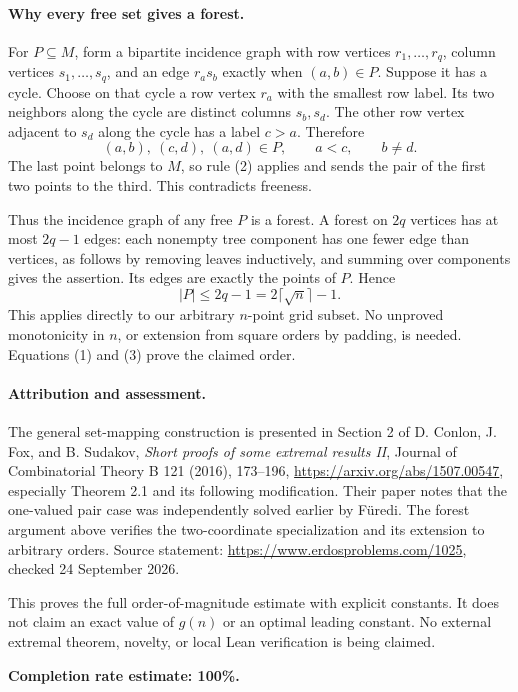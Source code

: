 \paragraph{Why every free set gives a forest.}
For \(P\subseteq M\), form a bipartite incidence graph with row vertices \(r_1,\ldots,r_q\), column vertices \(s_1,\ldots,s_q\), and an edge \(r_as_b\) exactly when \((a,b)\in P\).
Suppose it has a cycle. Choose on that cycle a row vertex \(r_a\) with the smallest row label. Its two neighbors along the cycle are distinct columns \(s_b,s_d\). The other row vertex adjacent to \(s_d\) along the cycle has a label \(c>a\). Therefore
\[
 (a,b),\ (c,d),\ (a,d)\in P,
 \qquad a<c,\qquad b\ne d.
\]
The last point belongs to \(M\), so rule (2) applies and sends the pair of the first two points to the third. This contradicts freeness.

Thus the incidence graph of any free \(P\) is a forest. A forest on \(2q\) vertices has at most \(2q-1\) edges: each nonempty tree component has one fewer edge than vertices, as follows by removing leaves inductively, and summing over components gives the assertion. Its edges are exactly the points of \(P\). Hence
\[
 |P|\leq2q-1=2\lceil\sqrt n\rceil-1. \tag{3}
\]
This applies directly to our arbitrary \(n\)-point grid subset. No unproved monotonicity in \(n\), or extension from square orders by padding, is needed. Equations (1) and (3) prove the claimed order.

\paragraph{Attribution and assessment.}
The general set-mapping construction is presented in Section 2 of D. Conlon, J. Fox, and B. Sudakov, \emph{Short proofs of some extremal results II}, Journal of Combinatorial Theory B 121 (2016), 173--196, \url{https://arxiv.org/abs/1507.00547}, especially Theorem 2.1 and its following modification. Their paper notes that the one-valued pair case was independently solved earlier by F\"uredi. The forest argument above verifies the two-coordinate specialization and its extension to arbitrary orders. Source statement: \url{https://www.erdosproblems.com/1025}, checked 24 September 2026.

This proves the full order-of-magnitude estimate with explicit constants. It does not claim an exact value of \(g(n)\) or an optimal leading constant. No external extremal theorem, novelty, or local Lean verification is being claimed.

\textbf{Completion rate estimate: 100\%.}
